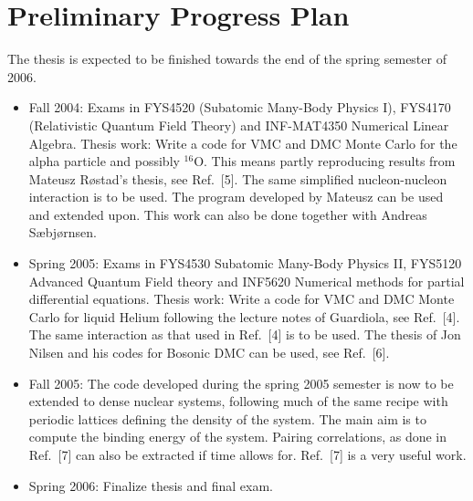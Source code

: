 \section*{Preliminary Progress Plan}
The thesis is expected to be finished towards the end  of the spring
semester of 2006.
\begin{itemize}
\item Fall 2004: 
      Exams in FYS4520 (Subatomic Many-Body Physics I), FYS4170 (Relativistic Quantum Field Theory) and  INF-MAT4350	Numerical Linear Algebra.
Thesis work: Write  a code for VMC and DMC Monte Carlo for the alpha particle and possibly $^{16}$O. 
This means partly reproducing 
results from Mateusz R\o stad's thesis, see Ref.~[5]. The same simplified nucleon-nucleon interaction
is to be used. 
The program developed by Mateusz can be used and extended upon. This work can also be done together
with Andreas S\ae bj\o rnsen.
\item Spring 2005:  Exams in FYS4530	Subatomic Many-Body Physics II, FYS5120
Advanced Quantum Field theory and INF5620 Numerical methods for partial differential equations.
Thesis work: Write a code for VMC and DMC Monte Carlo for liquid Helium following the lecture notes
of Guardiola, see Ref.~[4]. The same interaction as that used in Ref.~[4] is to be used.
The thesis of Jon Nilsen and his codes for Bosonic DMC can be used, see 
Ref.~[6].

\item Fall 2005: The code developed during the spring 2005 semester is now to be extended to dense
nuclear systems, following much of the same recipe with periodic lattices defining the density of
the system. The main aim is to compute the binding energy of the system. Pairing correlations, as done in
Ref.~[7] can also be extracted if time allows for. Ref.~[7] is a very useful work.
\item Spring 2006: Finalize thesis and final exam.
\end{itemize}

